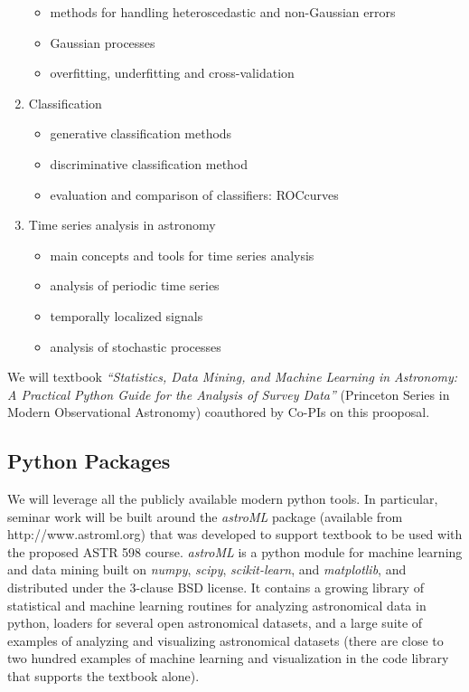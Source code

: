 \begin{enumerate}
\begin{itemize}
\item  methods for handling heteroscedastic and non-Gaussian errors 
\item  Gaussian processes
\item  overfitting, underfitting and cross-validation
\end{itemize} 
\item Classification 
\begin{itemize}
\item  generative classification methods
\item  discriminative classification method 
\item  evaluation and comparison of classifiers: ROCcurves 
\end{itemize} 
\item Time series analysis in astronomy
\begin{itemize}
\item  main concepts and tools for time series analysis
\item  analysis of periodic time series 
\item  temporally localized signals
\item  analysis of stochastic processes
\end{itemize} 
\end{enumerate} 


We will textbook {\it ``Statistics, Data Mining, and Machine Learning in Astronomy:
A Practical Python Guide for the Analysis of Survey Data''} (Princeton Series in Modern 
Observational Astronomy) coauthored by Co-PIs on this prooposal. 


\subsection{Python Packages} 

We will leverage all the publicly available modern python tools. In particular, seminar work will be 
built around the {\it astroML} package (available from http://www.astroml.org) that was developed 
to support textbook to be used with the proposed ASTR 598 course. {\it astroML} is a python module 
for machine learning and data mining built on {\it numpy}, {\it scipy}, {\it scikit-learn}, and {\it matplotlib}, 
and distributed under the 3-clause BSD license. It contains a growing library of statistical and machine 
learning routines for analyzing astronomical data in python, loaders for several open astronomical datasets, 
and a large suite of examples of analyzing and visualizing astronomical datasets (there are close to two 
hundred examples of machine learning and visualization in the code library that supports the textbook 
alone).

